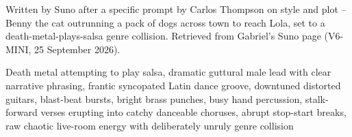 
\begin{notes}
Written by Suno after a specific prompt by Carlos Thompson on style and plot -- Benny the cat outrunning a pack of dogs across town to reach Lola, set to a death-metal-plays-salsa genre collision. Retrieved from Gabriel's Suno page (V6-MINI, 25 September 2026).
\end{notes}
\begin{style}
Death metal attempting to play salsa, dramatic guttural male lead with clear narrative phrasing, frantic syncopated Latin dance groove, downtuned distorted guitars, blast-beat bursts, bright brass punches, busy hand percussion, stalk-forward verses erupting into catchy danceable choruses, abrupt stop-start breaks, raw chaotic live-room energy with deliberately unruly genre collision
\end{style}
